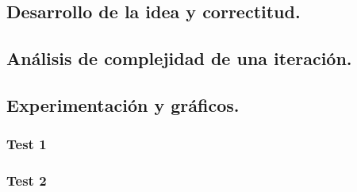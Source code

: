 \subsection{Desarrollo de la idea y correctitud.}

\vspace*{0.3cm}


 
\vspace*{0.6cm}


\subsection{Análisis de complejidad de una iteración.}

\vspace*{0.3cm}


\vspace*{0.6cm}
\subsection{Experimentación y gráficos.}

\vspace*{0.3cm}


\subsubsection{Test 1}
\vspace*{0.3cm}

\vspace*{0.6cm}

\subsubsection{Test 2}


